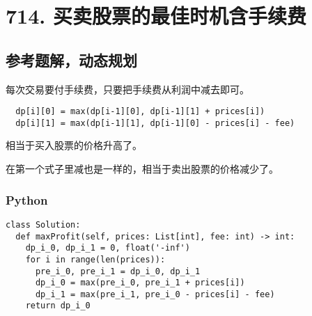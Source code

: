 \newpage
\section{714. 买卖股票的最佳时机含手续费}
\label{leetcode:714}

\subsection{参考题解，动态规划}

每次交易要付手续费，只要把手续费从利润中减去即可。

\begin{verbatim}
  dp[i][0] = max(dp[i-1][0], dp[i-1][1] + prices[i])
  dp[i][1] = max(dp[i-1][1], dp[i-1][0] - prices[i] - fee)
\end{verbatim}

相当于买入股票的价格升高了。

在第一个式子里减也是一样的，相当于卖出股票的价格减少了。

\subsubsection{Python}

\begin{verbatim}
class Solution:
  def maxProfit(self, prices: List[int], fee: int) -> int:
    dp_i_0, dp_i_1 = 0, float('-inf')
    for i in range(len(prices)):
      pre_i_0, pre_i_1 = dp_i_0, dp_i_1
      dp_i_0 = max(pre_i_0, pre_i_1 + prices[i])
      dp_i_1 = max(pre_i_1, pre_i_0 - prices[i] - fee)
    return dp_i_0
\end{verbatim}

